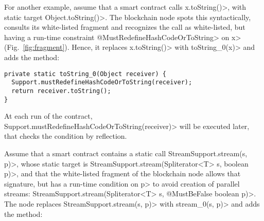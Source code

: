 

For another example, assume that a smart contract calls
\<x.toString()>, with static target \<Object.toString()>.
The blockchain node spots this syntactically,
consults its white-listed fragment and recognizes the call as
white-listed, but having a run-time constraint \<@MustRedefineHashCodeOrToString> on
\<x> (Fig.~\ref{fig:fragment}).
Hence, it replaces \<x.toString()> with \<toString\_0(x)> and adds
the method:

{\small\begin{verbatim}
private static toString_0(Object receiver) {
  Support.mustRedefineHashCodeOrToString(receiver);
  return receiver.toString();
}
\end{verbatim}}

\noindent
At each run of the contract,
\<Support.mustRedefineHashCodeOrToString(receiver)> will be executed later,
that checks the condition by reflection.

Assume that a smart contract contains a static call
\<StreamSupport.stream(s, p)>, whose static target is
\<StreamSupport.stream(Spliterator$\text{<}$T$\text{>}$ s, boolean p)>,
and that the white-listed fragment of the blockchain node allows that signature,
but has a run-time condition on \<p> to avoid creation of parallel streams:
\<StreamSupport.stream(Spliterator$\text{<}$T$\text{>}$ s, @MustBeFalse boolean p)>.
The node replaces \<StreamSupport.stream(s, p)> with \<stream\_0(s, p)> and adds
the method:

